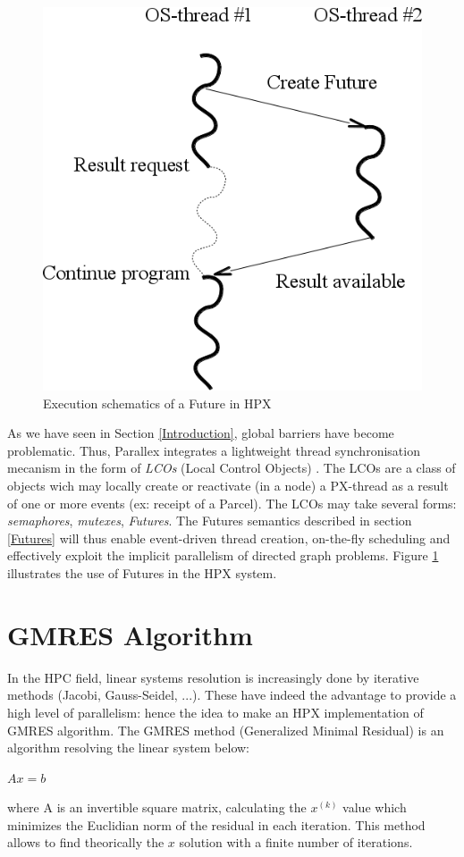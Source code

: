 \documentclass[conference]{acmsig-alternate-10pt}
\begin{document}
\begin{figure}[h]
\begin{center}
\includegraphics[scale=0.4]{Images/Im5.png}
\end{center}
\caption{Execution schematics of a Future in HPX}
\label{hpxthread}
\end{figure}

As we have seen in Section \ref{Introduction}, global barriers have become problematic. Thus, Parallex integrates a lightweight thread synchronisation mecanism in the form of \emph{LCOs} (Local Control Objects) \cite{Parallex}. The LCOs are a class of objects wich may locally create or reactivate (in a node) a PX-thread as a result of one or more events (ex: receipt of a Parcel). The LCOs may take several forms: \emph{semaphores}, \emph{mutexes}, \emph{Futures}. The Futures semantics described in section \ref{Futures} will thus enable event-driven thread creation, on-the-fly scheduling and effectively exploit the implicit parallelism of directed graph problems. Figure \ref{hpxthread} illustrates the use of Futures in the HPX system.

\section{GMRES Algorithm}\label{GMRES}
In the HPC field, linear systems resolution is increasingly done by iterative methods \cite{Methodes} (Jacobi, Gauss-Seidel, ...). These have indeed the advantage to provide a high level of parallelism: hence the idea to make an HPX implementation of GMRES algorithm. The GMRES method (Generalized Minimal Residual) \cite{GMRES} is an algorithm resolving the linear system below:
\begin{center}
  $Ax=b$
\end{center}
where A is an invertible square matrix, calculating the $x^{(k)}$ value which minimizes the Euclidian norm of the residual in each iteration. This method allows to find theorically the $x$ solution with a finite number of iterations.
\end{document}
